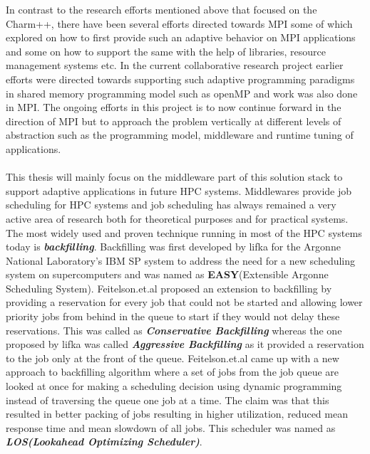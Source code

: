 In contrast to the research efforts mentioned above that focused on the Charm++, there have been several efforts directed towards MPI\cite{georgiou}\cite{travis}\cite{gladys}\cite{gonzalo}\cite{martin}\cite{gonzalo} some of which explored on how to first provide such an adaptive behavior on MPI applications and some on how to support the same with the help of libraries, resource management systems\cite{klein} etc. In the current collaborative research project earlier efforts were directed towards supporting such adaptive programming paradigms in shared memory programming model such as openMP\cite{andreas} and work was also done in MPI\cite{isaias}. The ongoing efforts in this project is to now continue forward in the direction of MPI but to approach the problem vertically at different levels of abstraction such as the programming model, middleware and runtime tuning of applications.\\ \\
This thesis will mainly focus on the middleware part of this solution stack to support adaptive applications in future HPC systems. Middlewares provide job scheduling for HPC systems and job scheduling has always remained a very active area of research both for theoretical purposes and for practical systems. The most widely used and proven technique running in most of the HPC systems today is \textbf{\textit{backfilling}}. Backfilling was first developed by lifka\cite{david} for the Argonne National Laboratory's IBM SP system to address the need for a new scheduling system on supercomputers and was named as \textbf{EASY}(Extensible Argonne Scheduling System). Feitelson.et.al\cite{ahuva} proposed an extension to backfilling by providing a reservation for every job that could not be started and allowing lower priority jobs from behind in the queue to start if they would not delay these reservations. This was called as \textbf{\textit{Conservative Backfilling}} whereas the one proposed by lifka was called \textbf{\textit{Aggressive Backfilling}} as it provided a reservation to the job only at the front of the queue. Feitelson.et.al\cite{dror} came up with a new approach to backfilling algorithm where a set of jobs from the job queue are looked at once for making a scheduling decision using dynamic programming instead of traversing the queue one job at a time. The claim was that this resulted in better packing of jobs resulting in higher utilization, reduced mean response time and mean slowdown of all jobs. This scheduler was named as \textbf{\textit{LOS(Lookahead Optimizing Scheduler)}}.\\ \\
